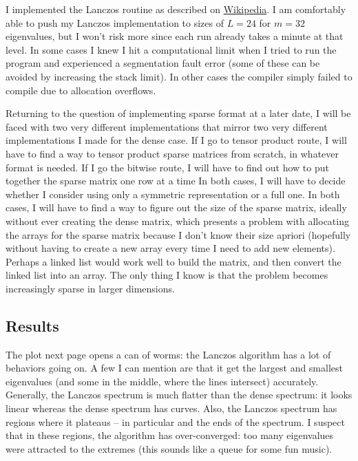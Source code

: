 \documentclass{article}
\begin{document}
I implemented the Lanczos routine as described on
\href{https://en.wikipedia.org/wiki/Lanczos_algorithm}{Wikipedia}.
I am comfortably able to push my Lanczos implementation to sizes of $L = 24$
for $m = 32$ eigenvalues, but I won't risk more since each run already takes
a minute at that level.
In some cases I knew I hit a computational limit when I tried to run the program
and experienced a segmentation fault error 
(some of these can be avoided by increasing the stack limit).
In other cases the compiler simply failed to compile due to allocation overflows.

Returning to the question of implementing sparse format at a later date,
I will be faced with two very different implementations that mirror
two very different implementations I made for the dense case.
If I go to tensor product route, I will have to find a way to tensor
product sparse matrices from scratch, in whatever format is needed.
If I go the bitwise route, I will have to find out how to put together
the sparse matrix one row at a time
In both cases, I will have to decide whether I consider using only a
symmetric representation or a full one.
In both cases, I will have to find a way to figure out the size of the
sparse matrix, ideally without ever creating the dense matrix, which
presents a problem with allocating the arrays for the sparse matrix
because I don't know their size apriori (hopefully without having to create 
a new array every time I need to add new elements).
Perhaps a linked list would work well to build the matrix, and then 
convert the linked list into an array.
The only thing I know is that the problem becomes
increasingly sparse in larger dimensions. 

\subsection{
Results
}

The plot next page opens a can of worms: the Lanczos algorithm has
a lot of behaviors going on.
A few I can mention are that it get the largest and smallest
eigenvalues (and some in the middle, where the lines intersect)
accurately.
Generally, the Lanczos spectrum is much flatter than the dense spectrum:
it looks linear whereas the dense spectrum has curves.
Also, the Lanczos spectrum has regions where it plateaus -- in particular
and the ends of the spectrum.
I suspect that in these regions, the algorithm has over-converged: too
many eigenvalues were attracted to the extremes
(this sounds like a queue for some fun music).
\end{document}
